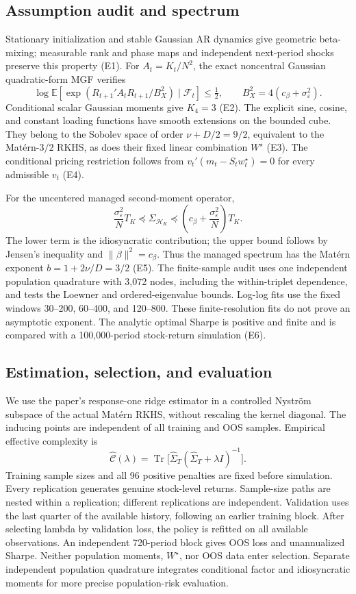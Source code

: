 \subsection{Assumption audit and spectrum}
Stationary initialization and stable Gaussian AR dynamics give geometric
beta-mixing; measurable rank and phase maps and independent next-period shocks
preserve this property (E1). For $A_t=K_t/N^2$, the exact noncentral Gaussian
quadratic-form MGF verifies
\[
\log\mathbb E\!\left[\exp\left(R_{t+1}'A_tR_{t+1}/B_X^2\right)
\mid\mathcal F_t\right]\leq\tfrac12,
\qquad B_X^2=4(c_\beta+\sigma_\varepsilon^2).
\]
Conditional scalar Gaussian moments give $K_4=3$ (E2). The explicit sine,
cosine, and constant loading functions have smooth extensions on the bounded
cube. They belong to the Sobolev space of order $\nu+D/2=9/2$, equivalent to
the Mat\'ern-$3/2$ RKHS, as does their fixed linear combination $W^\star$ (E3).
The conditional pricing restriction follows from
$v_t'(m_t-S_tw_t^\star)=0$ for every admissible $v_t$ (E4).

For the uncentered managed second-moment operator,
\[
\frac{\sigma_\varepsilon^2}{N}T_K\preceq\Sigma_{\mathcal H_K}
\preceq\left(c_\beta+\frac{\sigma_\varepsilon^2}{N}\right)T_K.
\]
The lower term is the idiosyncratic contribution; the upper bound follows by
Jensen's inequality and $\|\beta\|^2=c_\beta$. Thus the managed spectrum has
the Mat\'ern exponent $b=1+2\nu/D=3/2$ (E5). The finite-sample audit uses one
independent population quadrature with 3,072 nodes, including the within-triplet
dependence, and tests the Loewner and ordered-eigenvalue bounds. Log-log fits use
the fixed windows 30--200, 60--400, and 120--800. These finite-resolution fits do
not prove an asymptotic exponent. The analytic optimal Sharpe is positive and
finite and is compared with a 100,000-period stock-return simulation (E6).

\subsection{Estimation, selection, and evaluation}
We use the paper's response-one ridge estimator in a controlled Nystr\"om
subspace of the actual Mat\'ern RKHS, without rescaling the kernel diagonal.
The inducing points are independent of all training and OOS samples. Empirical
effective complexity is
\[
\widehat{\mathcal C}(\lambda)=\operatorname{Tr}
\bigl[\widehat\Sigma_T(\widehat\Sigma_T+\lambda I)^{-1}\bigr].
\]
Training sample sizes and all 96 positive penalties are fixed before simulation.
Every replication generates genuine stock-level returns. Sample-size paths are
nested within a replication; different replications are independent. Validation
uses the last quarter of the available history, following an earlier training
block. After selecting lambda by validation loss, the policy is refitted on all
available observations. An independent 720-period block gives OOS loss and
unannualized Sharpe. Neither population moments, $W^\star$, nor OOS data enter
selection. Separate independent population quadrature integrates conditional
factor and idiosyncratic moments for more precise population-risk evaluation.

